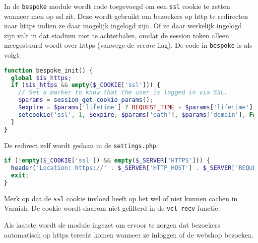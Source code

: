 In de \texttt{bespoke} module wordt code toegevoegd om een \texttt{ssl} cookie te zetten wanneer men op ssl zit. Deze wordt gebruikt om bezoekers op http te redirecten naar https indien ze daar mogelijk ingelogd zijn. Of ze daar werkelijk ingelogd zijn valt in dat stadium niet te achterhalen, omdat de session token alleen meegestuurd wordt over https (vanwege de \emph{secure} flag). De code in \texttt{bespoke} is als volgt:

\begin{lstlisting}[language=PHP]
function bespoke_init() {
  global $is_https;
  if ($is_https && empty($_COOKIE['ssl'])) {
    // Set a marker to know that the user is logged in via SSL.
    $params = session_get_cookie_params();
    $expire = $params['lifetime'] ? REQUEST_TIME + $params['lifetime'] : 0;
    setcookie('ssl', 1, $expire, $params['path'], $params['domain'], FALSE, TRUE);
  }
}
\end{lstlisting}

De redirect zelf wordt gedaan in de \texttt{settings.php}:

\begin{lstlisting}[language=PHP]
if (!empty($_COOKIE['ssl']) && empty($_SERVER['HTTPS'])) {
  header('Location: https://' . $_SERVER['HTTP_HOST'] . $_SERVER['REQUEST_URI'], TRUE, 302);
  exit;
}
\end{lstlisting}

Merk op dat de \texttt{ssl} cookie invloed heeft op het wel of niet kunnen cachen in Varnish. De cookie wordt daarom niet gefilterd in de \texttt{vcl\_recv} functie.

Als laatste wordt de  module ingezet om ervoor te zorgen dat bezoekers automatisch op https terecht komen wanneer ze inloggen of de webshop bezoeken.

